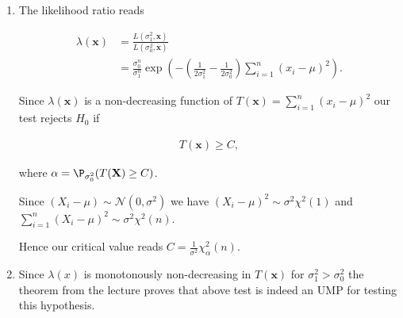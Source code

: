   \begin{solution}
  
  \phantom{}

  \begin{enumerate}[label = (\alph*)]
    \item The likelihood ratio reads

    \begin{align*}
      \lambda(\textbf{x}) &
      = \frac{L(\sigma_1^2, \textbf{x})}{L(\sigma_0^2, \textbf{x})} \\
      &= \frac{\sigma_0^n}{\sigma_1^n}
      \exp\left(-\left( \frac{1}{2\sigma_1^2} - \frac{1}{2\sigma_0^2}\right) \sum_{i=1}^n (x_i - \mu)^2\right).
    \end{align*}

    Since $\lambda(\textbf{x})$ is a non-decreasing function of
    $T(\textbf{x}) = \sum_{i=1}^n (x_i - \mu)^2$ our test rejects $H_0$ if

    \begin{align*}
      T(\textbf{x}) \geq C,
    \end{align*}

    where $\alpha = \P_{\sigma_0^2}(T(\textbf{X}) \geq C)$.

    Since $(X_i - \mu) \sim \mathcal{N}(0,\sigma^2)$ we have
    $(X_i - \mu)^2 \sim \sigma^2 \chi^2(1)$ and 
    $\sum_{i=1}^n (X_i - \mu)^2 \sim \sigma^2 \chi^2(n)$.

    Hence our critical value reads $C = \frac{1}{\sigma^2}\chi_{\alpha}^2(n)$.

    \item Since $\lambda(x)$ is monotonously non-decreasing in $T(\textbf{x})$ 
    for $\sigma_1^2 > \sigma_0^2$ the theorem from the lecture proves that 
    above test is indeed an UMP for testing this hypothesis.
  \end{enumerate}
  
  \end{solution}
  
  